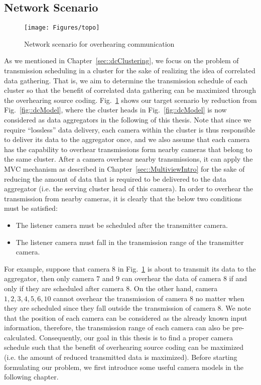 \subsection{Network Scenario}
\label{sec::networkScenario}
%
\begin{figure}
\centering
\texttt{[image: Figures/topo]}
\caption{\label{fig::sysModel}Network scenario for overhearing communication}
\end{figure}
%
As we mentioned in Chapter~\ref{sec::dcClustering}, we focus on the problem of transmission scheduling in a cluster for the sake of realizing the idea of correlated data gathering.
That is, we aim to determine the transmission schedule of each cluster so that the benefit of correlated data gathering can be maximized through the overhearing source coding.
Fig.~\ref{fig::sysModel} shows our target scenario by reduction from Fig.~\ref{fig::dcModel}, where the cluster heads in Fig.~\ref{fig::dcModel} is now considered as data aggregators in the following of this thesis.
Note that since we require ``lossless'' data delivery, each camera within the cluster is thus responsible to deliver its data to the aggregator once, and we also assume that each camera has the capability to overhear transmissions form nearby cameras that belong to the same cluster.
After a camera overhear nearby transmissions, it can apply the MVC mechanism as described in Chapter~\ref{sec::MultiviewIntro} for the sake of reducing the amount of data that is required to be delivered to the data aggregator (i.e. the serving cluster head of this camera).
In order to overhear the transmission from nearby cameras, it is clearly that the below two conditions must be satisfied:
\begin{itemize}
\item The listener camera must be scheduled after the transmitter camera.
\item The listener camera must fall in the transmission range of the transmitter camera.
\end{itemize}
For example, suppose that camera $8$ in Fig.~\ref{fig::sysModel} is about to transmit its data to the aggregator, then only camera $7$ and $9$ can overhear the data of camera $8$ if and only if they are scheduled after camera $8$.
On the other hand, camera ${1,2,3,4,5,6,10}$ cannot overhear the transmission of camera $8$ no matter when they are scheduled since they fall outside the transmission of camera $8$.
We note that the position of each camera can be considered as the already known input information, therefore, the transmission range of each camera can also be pre-calculated.
Consequently, our goal in this thesis is to find a proper camera schedule such that the benefit of overhearing source coding can be maximized (i.e. the amount of reduced transmitted data is maximized).
Before starting formulating our problem, we first introduce some useful camera models in the following chapter.